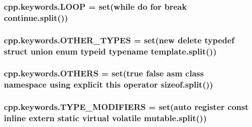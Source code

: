 \subsubsection[{\texorpdfstring{L\+O\+OP}{LOOP}}]{\setlength{\rightskip}{0pt plus 5cm}cpp.\+keywords.\+L\+O\+OP = {\bf set}(\textquotesingle{}while do for break continue\textquotesingle{}.split())}\hypertarget{namespacecpp_1_1keywords_af0164c05398a2291487b76414102d555}{}\label{namespacecpp_1_1keywords_af0164c05398a2291487b76414102d555}
\subsubsection[{\texorpdfstring{O\+T\+H\+E\+R\+\_\+\+T\+Y\+P\+ES}{OTHER_TYPES}}]{\setlength{\rightskip}{0pt plus 5cm}cpp.\+keywords.\+O\+T\+H\+E\+R\+\_\+\+T\+Y\+P\+ES = {\bf set}(\textquotesingle{}new delete typedef struct union enum typeid typename template\textquotesingle{}.split())}\hypertarget{namespacecpp_1_1keywords_aa86a5e35a3ace14022a5ca1b91baf207}{}\label{namespacecpp_1_1keywords_aa86a5e35a3ace14022a5ca1b91baf207}
\subsubsection[{\texorpdfstring{O\+T\+H\+E\+RS}{OTHERS}}]{\setlength{\rightskip}{0pt plus 5cm}cpp.\+keywords.\+O\+T\+H\+E\+RS = {\bf set}(\textquotesingle{}true false asm class namespace using explicit this operator sizeof\textquotesingle{}.split())}\hypertarget{namespacecpp_1_1keywords_a15fe231fbad145538b73892804898809}{}\label{namespacecpp_1_1keywords_a15fe231fbad145538b73892804898809}
\subsubsection[{\texorpdfstring{T\+Y\+P\+E\+\_\+\+M\+O\+D\+I\+F\+I\+E\+RS}{TYPE_MODIFIERS}}]{\setlength{\rightskip}{0pt plus 5cm}cpp.\+keywords.\+T\+Y\+P\+E\+\_\+\+M\+O\+D\+I\+F\+I\+E\+RS = {\bf set}(\textquotesingle{}auto register const inline extern static virtual volatile mutable\textquotesingle{}.split())}\hypertarget{namespacecpp_1_1keywords_af9282ce418d6b4b43dca5ed574caedd7}{}\label{namespacecpp_1_1keywords_af9282ce418d6b4b43dca5ed574caedd7}
